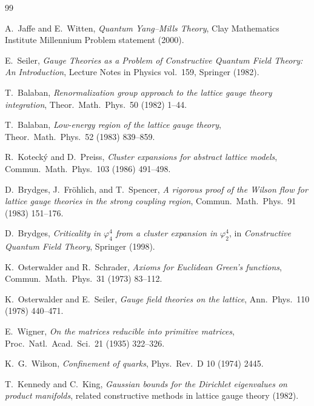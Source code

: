 \documentclass[11pt,a4paper]{article}
\begin{document}
\begin{thebibliography}{99}

A.~Jaffe and E.~Witten,
\emph{Quantum Yang--Mills Theory},
Clay Mathematics Institute Millennium Problem statement (2000).

E.~Seiler,
\emph{Gauge Theories as a Problem of Constructive Quantum Field Theory:
An Introduction},
Lecture Notes in Physics vol.~159, Springer (1982).

T.~Balaban,
\emph{Renormalization group approach to the lattice gauge theory
integration},
Theor.~Math.~Phys.~50 (1982) 1--44.

T.~Balaban,
\emph{Low-energy region of the lattice gauge theory},
Theor.~Math.~Phys.~52 (1983) 839--859.

R.~Koteck\'y and D.~Preiss,
\emph{Cluster expansions for abstract lattice models},
Commun.~Math.~Phys.~103 (1986) 491--498.

D.~Brydges, J.~Fr\"ohlich, and T.~Spencer,
\emph{A rigorous proof of the Wilson flow for lattice gauge theories
in the strong coupling region},
Commun.~Math.~Phys.~91 (1983) 151--176.

D.~Brydges,
\emph{Criticality in $\varphi^4_4$ from a cluster expansion in
$\varphi^4_2$},
in \emph{Constructive Quantum Field Theory}, Springer (1998).

K.~Osterwalder and R.~Schrader,
\emph{Axioms for Euclidean Green's functions},
Commun.~Math.~Phys.~31 (1973) 83--112.

K.~Osterwalder and E.~Seiler,
\emph{Gauge field theories on the lattice},
Ann.~Phys.~110 (1978) 440--471.

E.~Wigner,
\emph{On the matrices reducible into primitive matrices},
Proc.~Natl.~Acad.~Sci.~21 (1935) 322--326.

K.~G.~Wilson,
\emph{Confinement of quarks},
Phys.~Rev.~D 10 (1974) 2445.

T.~Kennedy and C.~King,
\emph{Gaussian bounds for the Dirichlet eigenvalues on product manifolds},
related constructive methods in lattice gauge theory (1982).

\end{thebibliography}
\end{document}

